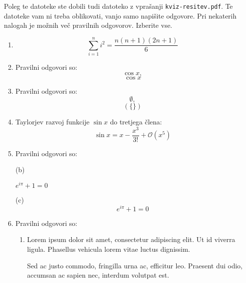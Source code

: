 \documentclass[11pt]{article}
\begin{document}
Poleg te datoteke ste dobili tudi datoteko z vprašanji \texttt{kviz-resitev.pdf}.
Te datoteke vam ni treba oblikovati, vanjo samo napišite odgovore.
Pri nekaterih nalogah je možnih več pravilnih odgovorov. Izberite vse.

\begin{enumerate}
    \item $$\sum _{i=1}^n i^2=\frac{n(n+1)(2n+1)}{6}$$%

    \item Pravilni odgovori so: $$\cos x,$$ $$\operatorname{cos}x$$
    
    \item Pravilni odgovori so: $$\emptyset,$$ $$(\{\})$$
    
    \item Taylorjev razvoj funkcije $\sin x$ do tretjega člena:$$\sin x=x-\frac{x^3}{3!}+\mathcal{O}(x^5)$$

    \item Pravilni odgovori so:  %
    
    (b)
      \begin{center}
          \( e^{i \pi} + 1 = 0 \)
      \end{center}
    (c)
      \begin{equation*}
          e^{i \pi} + 1 = 0
      \end{equation*}

    \item Pravilni odgovori so: %
        \begin{enumerate}
            \item {
                Lorem ipsum dolor sit amet, consectetur adipiscing elit. Ut id viverra ligula. Phasellus vehicula lorem vitae luctus dignissim. 
                
                Sed ac justo commodo, fringilla urna ac, efficitur leo. Praesent dui odio, accumsan ac sapien nec, interdum volutpat est. 
            }
        \end{enumerate}
    

\end{enumerate}
\end{document}
